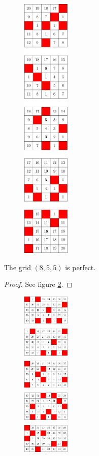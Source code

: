 \begin{figure}[]
\centering
\includegraphics[width=0.2\textwidth]{figures/7/5x5x5_numbered_heatmap.pdf}
\caption{}
\label{fig:5x5x5_numbered_heatmap}
\end{figure}

\begin{con}
\label{con:8x5x5}
The grid $(8,5,5)$ is perfect.
\end{con}

\begin{proof}
See figure \ref{fig:5x8x5_numbered_heatmap}.
\end{proof}

\begin{figure}[]
\centering
\includegraphics[width=0.2\textwidth]{figures/7/5x8x5_numbered_heatmap.pdf}
\caption{}
\label{fig:5x8x5_numbered_heatmap}
\end{figure}

